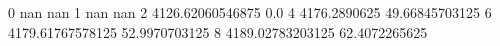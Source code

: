 0 nan nan
1 nan nan
2 4126.62060546875 0.0
4 4176.2890625 49.66845703125
6 4179.61767578125 52.9970703125
8 4189.02783203125 62.4072265625
